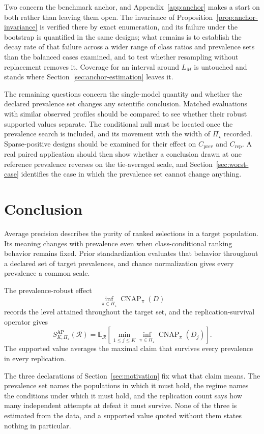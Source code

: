 \documentclass[11pt]{article}
\newcommand{\CNAP}{\operatorname{CNAP}}
\newcommand{\Regime}{\mathcal{R}}
\newcommand{\PSet}{\Pi_\star}
\newcommand{\E}{\mathbb{E}}
\theoremstyle{remark}
\begin{document}
Two concern the benchmark anchor, and Appendix~\ref{app:anchor} makes a start on both rather than leaving them open. The invariance of Proposition~\ref{prop:anchor-invariance} is verified there by exact enumeration, and its failure under the bootstrap is quantified in the same designs; what remains is to establish the decay rate of that failure across a wider range of class ratios and prevalence sets than the balanced cases examined, and to test whether resampling without replacement removes it. Coverage for an interval around $L_M$ is untouched and stands where Section~\ref{sec:anchor-estimation} leaves it.

The remaining questions concern the single-model quantity and whether the declared prevalence set changes any scientific conclusion. Matched evaluations with similar observed profiles should be compared to see whether their robust supported values separate. The conditional null must be located once the prevalence search is included, and its movement with the width of $\PSet$ recorded. Sparse-positive designs should be examined for their effect on $C_{\mathrm{prev}}$ and $C_{\mathrm{rep}}$. A real paired application should then show whether a conclusion drawn at one reference prevalence reverses on the tie-averaged scale, and Section~\ref{sec:worst-case} identifies the case in which the prevalence set cannot change anything.

\section{Conclusion}

Average precision describes the purity of ranked selections in a target population. Its meaning changes with prevalence even when class-conditional ranking behavior remains fixed. Prior standardization evaluates that behavior throughout a declared set of target prevalences, and chance normalization gives every prevalence a common scale.

The prevalence-robust effect
\[
\inf_{\pi\in\PSet}\CNAP_\pi(D)
\]
records the level attained throughout the target set, and the replication-survival operator gives
\[
S_{K,\PSet}^{\mathrm{AP}}(\Regime)
=
\E_{\Regime}
\left[
\min_{1\leq j\leq K}
\inf_{\pi\in\PSet}
\CNAP_\pi(D_j)
\right].
\]
The supported value averages the maximal claim that survives every prevalence in every replication.

The three declarations of Section~\ref{sec:motivation} fix what that claim means. The prevalence set names the populations in which it must hold, the regime names the conditions under which it must hold, and the replication count says how many independent attempts at defeat it must survive. None of the three is estimated from the data, and a supported value quoted without them states nothing in particular.
\end{document}
